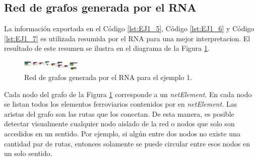 \subsection{Red de grafos generada por el RNA}

 	La información exportada en el Código \ref{lst:EJ1_5}, Código \ref{lst:EJ1_6} y Código \ref{lst:EJ1_7} es utilizada resumida por el RNA para una mejor interpretacion. El resultado de este resumen se ilustra en el diagrama de la Figura \ref{fig:EJ1_8}.

	\begin{figure}[H]
		\centering
		\includegraphics[angle = 90, origin = c, width=0.25\textwidth]{Figuras/Graph_1}
		\centering\caption{Red de grafos generada por el RNA para el ejemplo 1.}
		\label{fig:EJ1_8}
	\end{figure}
	
	Cada nodo del grafo de la Figura \ref{fig:EJ1_8} corresponde a un \textit{netElement}. En cada nodo se listan todos los elementos ferroviarios contenidos por en \textit{netElement}. Las aristas del grafo son las rutas que los conectan. De esta manera, es posible detectar visualmente cualquier nodo aislado de la red o nodos que solo son accedidos en un sentido. Por ejemplo, si algún entre dos nodos no existe una cantidad par de rutas, entonces solamente se puede circular entre esos nodos en un solo sentido.